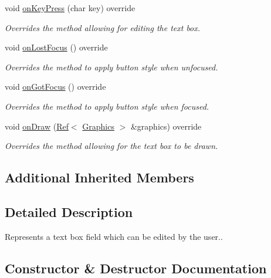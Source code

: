 \begin{DoxyCompactItemize}
void \mbox{\hyperlink{class_text_box_ae879afb224d1ad754996d2386743c2da}{on\+Key\+Press}} (char key) override
\begin{DoxyCompactList}\small\item\em Overrides the method allowing for editing the text box. \end{DoxyCompactList}\item 
void \mbox{\hyperlink{class_text_box_aab9c57dae96c908b9b3a4f03b837a9fe}{on\+Lost\+Focus}} () override
\begin{DoxyCompactList}\small\item\em Overrides the method to apply button style when unfocused. \end{DoxyCompactList}\item 
void \mbox{\hyperlink{class_text_box_acf8cced7a7c1ebb3b8bd72ee0901eef8}{on\+Got\+Focus}} () override
\begin{DoxyCompactList}\small\item\em Overrides the method to apply button style when focused. \end{DoxyCompactList}\item 
void \mbox{\hyperlink{class_text_box_abd8f18ee1d846bf8cdf0ab93b6302bf9}{on\+Draw}} (\mbox{\hyperlink{class_ref}{Ref}}$<$ \mbox{\hyperlink{class_graphics}{Graphics}} $>$ \&graphics) override
\begin{DoxyCompactList}\small\item\em Overrides the method allowing for the text box to be drawn. \end{DoxyCompactList}\end{DoxyCompactItemize}
\subsection*{Additional Inherited Members}


\subsection{Detailed Description}
Represents a text box field which can be edited by the user.. 



\subsection{Constructor \& Destructor Documentation}
\mbox{\label{class_text_box_a25b67e5ff6788c60b8aef3f3540879d0}} 
